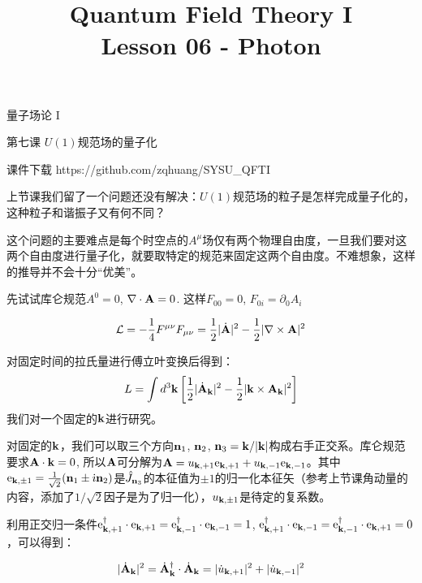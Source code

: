 \documentclass[CJK]{beamer}
\title{Quantum Field Theory I \\ Lesson 06 - Photon}
\author{}
\date{}
\begin{document}
\begin{frame}
 
\begin{center}
\begin{Large}
\bch
量子场论 I 

{\vskip 0.3in}

第七课 $U(1)$规范场的量子化

\ech
\end{Large}
\end{center}

\vskip 0.2in

\bch
课件下载
\ech
https://github.com/zqhuang/SYSU\_QFTI

\end{frame}



\begin{frame}
\bch
上节课我们留了一个问题还没有解决：$U(1)$规范场的粒子是怎样完成量子化的，这种粒子和谐振子又有何不同？

\skipline
这个问题的主要难点是每个时空点的$A^\mu$场仅有两个物理自由度，一旦我们要对这两个自由度进行量子化，就要取特定的规范来固定这两个自由度。不难想象，这样的推导并不会十分“优美”。

\ech
\end{frame}

\begin{frame}
\bch
先试试库仑规范$A^0 = 0$, $\nabla \cdot {\mathbf{A}} = 0$.
这样$F_{00} = 0$, $F_{0i} = \partial_0 A_i$

$$ {\mathcal{L}} = -\frac{1}{4} {F^{\mu\nu}}{F_{\mu\nu}} = \frac{1}{2} |\dot{{\mathbf{A}}}|^2  - \frac{1}{2}|\nabla \times {\mathbf{A}}|^2$$

对固定时间的拉氏量进行傅立叶变换后得到：
$$L = \int d^3{\mathbf{k}} \left[\frac{1}{2} |\dot{{\mathbf{A}}}_{\mathbf{k}}|^2  - \frac{1}{2}|{\mathbf{k}} \times {\mathbf{A}}_{\mathbf{k}}|^2\right]$$
我们对一个固定的${\mathbf{k}}$进行研究。

\ech
\end{frame}

\begin{frame}
\bch
对固定的${\mathbf{k}}$，我们可以取三个方向${\mathbf{n}}_1$, ${\mathbf{n}}_2$, ${\mathbf{n}}_3 = {\mathbf{k}} / |{\mathbf{k}}|$构成右手正交系。库仑规范要求${\mathbf{A}}\cdot{\mathbf{k}} = 0$, 所以${\mathbf{A}}$可分解为${\mathbf{A}} = u_{{\mathbf{k}},+1} \mathrm{e}_{{\mathbf{k}},+1} + u_{{\mathbf{k}},-1} \mathrm{e}_{{\mathbf{k}},-1}$。其中$\mathrm{e}_{{\mathbf{k}},\pm 1} = \frac{1}{\sqrt{2}}({\mathbf{n}}_1\pm {\dot{\imath}} {\mathbf{n}}_2)$是$\hat{J}_{{\mathbf{n}}_3}$的本征值为$\pm 1$的归一化本征矢（参考上节课角动量的内容，添加了$1/\sqrt{2}$因子是为了归一化），$u_{{\mathbf{k}},\pm 1}$是待定的复系数。

利用正交归一条件$\mathrm{e}_{{\mathbf{k}},+1}^\dagger \cdot \mathrm{e}_{{\mathbf{k}},+1} = \mathrm{e}_{{\mathbf{k}},-1}^\dagger \cdot \mathrm{e}_{{\mathbf{k}},-1} = 1$, $\mathrm{e}_{{\mathbf{k}},+1}^\dagger \cdot \mathrm{e}_{{\mathbf{k}},-1} = \mathrm{e}_{{\mathbf{k}},-1}^\dagger \cdot \mathrm{e}_{{\mathbf{k}},+1} = 0$，可以得到：

$$|\dot{{\mathbf{A}}}_{\mathbf{k}}|^2 = \dot{{\mathbf{A}}}_{\mathbf{k}}^\dagger \cdot \dot{{\mathbf{A}}}_{\mathbf{k}} = |\dot u_{{\mathbf{k}},+1}|^2 + |\dot u_{{\mathbf{k}},-1}|^2$$

\ech
\end{frame}
\end{document}
